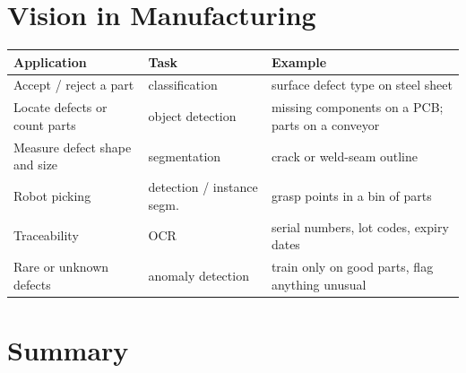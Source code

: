 \documentclass[12pt, a4paper]{article}
\begin{document}
\section{Vision in Manufacturing}

\begin{center}
  \renewcommand{\arraystretch}{1.35}
  \begin{tabular}{>{\raggedright\arraybackslash}p{5.2cm}
    >{\raggedright\arraybackslash}p{3.6cm}
    >{\raggedright\arraybackslash}p{5.4cm}}
    \toprule
    Application                   & Task                       & Example                                          \\
    \midrule
    Accept / reject a part        & classification             & surface defect type on steel sheet               \\
    Locate defects or count parts & object detection           & missing components on a PCB; parts on a conveyor \\
    Measure defect shape and size & segmentation               & crack or weld-seam outline                       \\
    Robot picking                 & detection / instance segm. & grasp points in a bin of parts                   \\
    Traceability                  & OCR                        & serial numbers, lot codes, expiry dates          \\
    Rare or unknown defects       & anomaly detection          & train only on good parts, flag anything unusual  \\
    \bottomrule
  \end{tabular}
\end{center}

\section{Summary}
\end{document}

